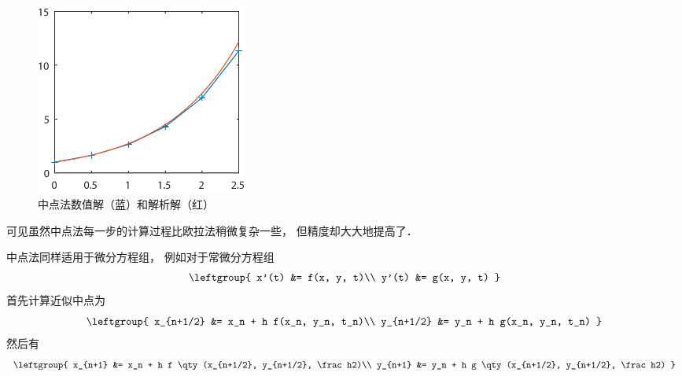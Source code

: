 \begin{figure}[ht]
\centering
\includegraphics[width=7cm]{./figures/OdeMid2.pdf}
\caption{中点法数值解（蓝）和解析解（红）} \label{OdeMid_fig2}
\end{figure}

可见虽然中点法每一步的计算过程比欧拉法稍微复杂一些， 但精度却大大地提高了． 

中点法同样适用于微分方程组， 例如对于常微分方程组
\begin{equation}\leftgroup{
x'(t) &= f(x, y, t)\\
y'(t) &= g(x, y, t)
}\end{equation}
首先计算近似中点为
\begin{equation}\leftgroup{
x_{n+1/2} &= x_n + h f(x_n, y_n, t_n)\\
y_{n+1/2} &= y_n + h g(x_n, y_n, t_n)
}\end{equation}
然后有
\begin{equation}\label{OdeMid_eq7}
\leftgroup{
x_{n+1} &= x_n + h f \qty(x_{n+1/2}, y_{n+1/2}, \frac h2)\\
y_{n+1} &= y_n + h g \qty(x_{n+1/2}, y_{n+1/2}, \frac h2)
}\end{equation}




